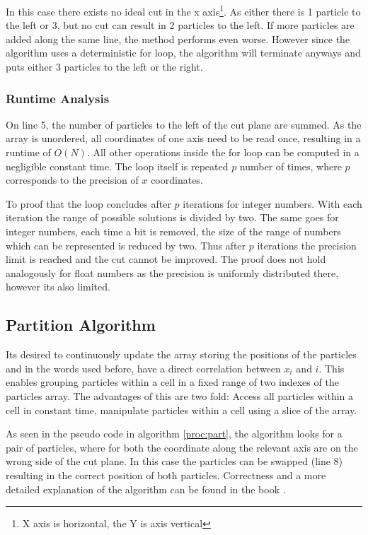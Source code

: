 \documentclass[]{article}
\begin{document}
In this case there exists no ideal cut in the x axis\footnote{X axis is horizontal, the Y is axis vertical}. As either there is 1 particle to the left or 3, but no cut can result in 2 particles to the left. If more particles are added along the same line, the method performs even worse. However since the algorithm uses a deterministic for loop, the algorithm will terminate anyways and puts either 3 particles to the left or the right.

\subsubsection{Runtime Analysis}

On line 5, the number of particles to the left of the cut plane are summed. As the array is unordered, all coordinates of one axis need to be read once, resulting in a runtime of $O(N)$. All other operations inside the for loop can be computed in a negligible constant time. The loop itself is repeated $p$ number of times, where $p$ corresponds to the precision of $x$ coordinates.

To proof that the loop concludes after $p$ iterations for integer numbers. With each iteration the range of possible solutions is divided by two. The same goes for integer numbers, each time a bit is removed, the size of the range of numbers which can be represented is reduced by two. Thus after $p$ iterations the precision limit is reached and the cut cannot be improved. The proof does not hold analogously for float numbers as the precision is uniformly distributed there, however its also limited. 

\subsection{Partition Algorithm}\label{sec:part}

Its desired to continuously update the array storing the positions of the particles and in the words used before, have a direct correlation between $x_i$ and $i$. This enables grouping particles within a cell in a fixed range of two indexes of the particles array. The advantages of this are two fold: Access all particles within a cell in constant time, manipulate particles within a cell using a slice of the array. 

As seen in the pseudo code in algorithm \ref{proc:part}, the algorithm looks for a pair of particles, where for both the coordinate along the relevant axis are  on the wrong side of the cut plane. In this case the particles can be swapped (line 8) resulting in the correct position of both particles. Correctness and a more detailed explanation of the algorithm can be found in the book  \cite{algorithms}. 
\end{document}
